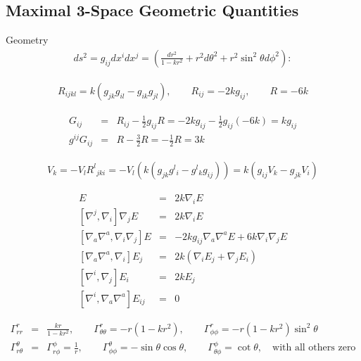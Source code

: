\documentclass[10pt,letterpaper]{article}
\numberwithin{equation}{section}
\begin{document}
\begin{appendices}
\section{Maximal 3-Space Geometric Quantities}
Geometry
\begin{eqnarray}
ds^2 = g_{ij}dx^idx^j = \left( \frac{dr^2}{1-kr^2} + r^2 d\theta^2 + r^2\sin^2\theta d\phi^2\right):
\end{eqnarray}

\begin{eqnarray}
R_{ijkl} = k(g_{jk}g_{il}-g_{ik}g_{jl}),\qquad R_{ij} = -2kg_{ij},\qquad R = -6k
\end{eqnarray}

\begin{eqnarray}
G_{ij} &=& R_{ij} - \frac12 g_{ij} R = -2k g_{ij} -\frac12 g_{ij}(-6k) =k g_{ij}
\nonumber\\{}
g^{ij}G_{ij} &=& R-\frac32 R = -\frac12 R = 3k
\end{eqnarray}

\begin{eqnarray}
[\nabla_i,\nabla_j]V_k =- V_l R^l{}_{jki}= -V_l ( k(g_{jk}g^{l}{}_i - g^l{}_k g_{ij})) = k(g_{ij} V_k - g_{jk}V_i)
\label{covcom}
\end{eqnarray}

\begin{eqnarray}
[\nabla_a \nabla^a ,\nabla_i] E &=& 2k\nabla_i E
\nonumber\\{}
[\nabla^j,\nabla_i]\nabla_j E &=& 2k\nabla_i E
\nonumber\\{}
 [\nabla_a\nabla^a,\nabla_i\nabla_j]E &=& -2kg_{ij}\nabla_a\nabla^a E + 6k\nabla_i\nabla_j E
\nonumber\\{}
[\nabla_a \nabla^a, \nabla_i] E_j &=& 2k(\nabla_i E_j + \nabla_j E_i)
\nonumber\\{}
[\nabla^i,\nabla_j]E_i &=& 2kE_j
\nonumber\\{}
[\nabla^i,\nabla_a\nabla^a]E_{ij} &=& 0
\end{eqnarray}

\begin{eqnarray}
\Gamma^r_{rr} &=& \frac{kr}{1-kr^2},\qquad \Gamma^r_{\theta\theta} = -r(1-kr^2),\qquad \Gamma^r_{\phi\phi} = -r(1-kr^2)\sin^2\theta
\nonumber\\
\Gamma^\theta_{r\theta} &=& \Gamma^{\phi}_{r\phi} = \frac{1}{r},\qquad \Gamma^{\theta}_{\phi\phi} = -\sin\theta\cos\theta, \qquad \Gamma^{\phi}_{\theta\phi} = \cot\theta,\quad\text{with all others zero}
\end{eqnarray}
 
\end{appendices}
\end{document}
